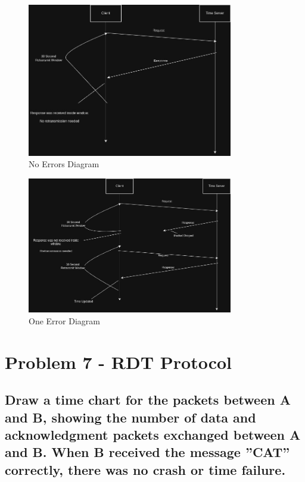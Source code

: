 \documentclass{article}
\begin{document}
	\begin{figure}[H]
		\centering
		\includegraphics[width=0.8\textwidth]{no_errors.jpg}
		\caption{No Errors Diagram}
		\label{fig:no_errors}
	\end{figure}

	\begin{figure}[H]
		\centering
		\includegraphics[width=0.8\textwidth]{one_error.jpg}
		\caption{One Error Diagram}
		\label{fig:one_error}
	\end{figure}

\section{Problem 7 - RDT Protocol}

\subsection{Draw a time chart for the packets between A and B, showing the number of
data and acknowledgment packets exchanged between A and B. When B received the
message ”CAT” correctly, there was no crash or time failure.}
\end{document}
